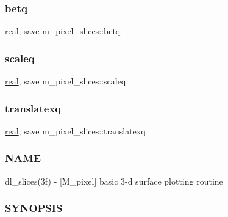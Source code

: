 \subsubsection{\texorpdfstring{betq}{betq}}
{\footnotesize\ttfamily \hyperlink{read__watch_83_8txt_abdb62bde002f38ef75f810d3a905a823}{real}, save m\+\_\+pixel\+\_\+slices\+::betq\hspace{0.3cm}{\ttfamily [private]}}

\mbox{\label{namespacem__pixel__slices_a560f9a31fb656d89f985a6bb0c00d815}} 
\subsubsection{\texorpdfstring{scaleq}{scaleq}}
{\footnotesize\ttfamily \hyperlink{read__watch_83_8txt_abdb62bde002f38ef75f810d3a905a823}{real}, save m\+\_\+pixel\+\_\+slices\+::scaleq\hspace{0.3cm}{\ttfamily [private]}}

\mbox{\label{namespacem__pixel__slices_a984b384660455b08f81e6ba889c4f181}} 
\subsubsection{\texorpdfstring{translatexq}{translatexq}}
{\footnotesize\ttfamily \hyperlink{read__watch_83_8txt_abdb62bde002f38ef75f810d3a905a823}{real}, save m\+\_\+pixel\+\_\+slices\+::translatexq\hspace{0.3cm}{\ttfamily [private]}}



\subsubsection*{N\+A\+ME}

dl\+\_\+slices(3f) -\/ \mbox{[}M\+\_\+pixel\mbox{]} basic 3-\/d surface plotting routine 

\subsubsection*{S\+Y\+N\+O\+P\+S\+IS}

